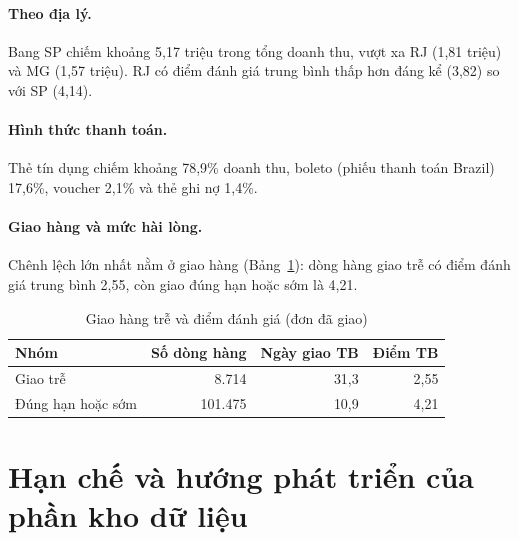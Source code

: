 \documentclass[12pt,a4paper]{article}
\begin{document}
\paragraph{Theo địa lý.}
Bang SP chiếm khoảng 5,17 triệu trong tổng doanh thu, vượt xa RJ (1,81 triệu) và MG (1,57 triệu). RJ có điểm đánh giá
trung bình thấp hơn đáng kể (3,82) so với SP (4,14).

\paragraph{Hình thức thanh toán.}
Thẻ tín dụng chiếm khoảng 78,9\% doanh thu, boleto (phiếu thanh toán Brazil) 17,6\%, voucher 2,1\% và thẻ ghi nợ 1,4\%.

\paragraph{Giao hàng và mức hài lòng.}
Chênh lệch lớn nhất nằm ở giao hàng (Bảng~\ref{tab:delay}): dòng hàng giao trễ có điểm đánh giá trung bình
2,55, còn giao đúng hạn hoặc sớm là 4,21.

\begin{table}[h]
\centering
\caption{Giao hàng trễ và điểm đánh giá (đơn đã giao)}\label{tab:delay}
\small
\begin{tabular}{@{}l r r r@{}}
\toprule
\textbf{Nhóm} & \textbf{Số dòng hàng} & \textbf{Ngày giao TB} & \textbf{Điểm TB}\\
\midrule
Giao trễ & 8.714 & 31,3 & 2,55\\
Đúng hạn hoặc sớm & 101.475 & 10,9 & 4,21\\
\bottomrule
\end{tabular}
\end{table}

\section{Hạn chế và hướng phát triển của phần kho dữ liệu}
\end{document}
